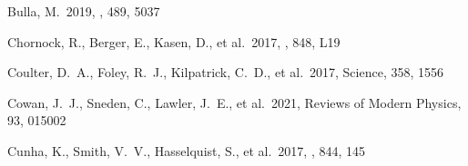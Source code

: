 \documentclass[twocolumn,twocolappendix]{aastex63}
\begin{document}
\begin{thebibliography}{}
 Bulla, M.\ 2019, \mnras, 489, 5037








 Chornock, R., Berger, E., Kasen, D., et al.\ 2017, \apjl, 848, L19














 Coulter, D.~A., Foley, R.~J., Kilpatrick, C.~D., et al.\ 2017, Science, 358, 1556




 Cowan, J.~J., Sneden, C., Lawler, J.~E., et al.\ 2021, Reviews of Modern Physics, 93, 015002


 Cunha, K., Smith, V.~V., Hasselquist, S., et al.\ 2017, \apj, 844, 145



\end{thebibliography}
\end{document}
